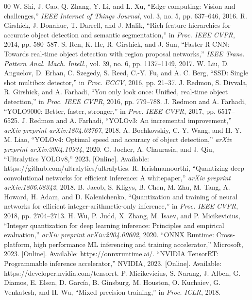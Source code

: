 \documentclass[conference]{IEEEtran}
\begin{document}
\begin{thebibliography}{00}
 W. Shi, J. Cao, Q. Zhang, Y. Li, and L. Xu, ``Edge computing: Vision and challenges,'' \textit{IEEE Internet of Things Journal}, vol. 3, no. 5, pp. 637--646, 2016.
 R. Girshick, J. Donahue, T. Darrell, and J. Malik, ``Rich feature hierarchies for accurate object detection and semantic segmentation,'' in \textit{Proc. IEEE CVPR}, 2014, pp. 580--587.
 S. Ren, K. He, R. Girshick, and J. Sun, ``Faster R-CNN: Towards real-time object detection with region proposal networks,'' \textit{IEEE Trans. Pattern Anal. Mach. Intell.}, vol. 39, no. 6, pp. 1137--1149, 2017.
 W. Liu, D. Anguelov, D. Erhan, C. Szegedy, S. Reed, C.-Y. Fu, and A. C. Berg, ``SSD: Single shot multibox detector,'' in \textit{Proc. ECCV}, 2016, pp. 21--37.
 J. Redmon, S. Divvala, R. Girshick, and A. Farhadi, ``You only look once: Unified, real-time object detection,'' in \textit{Proc. IEEE CVPR}, 2016, pp. 779--788.
 J. Redmon and A. Farhadi, ``YOLO9000: Better, faster, stronger,'' in \textit{Proc. IEEE CVPR}, 2017, pp. 6517--6525.
 J. Redmon and A. Farhadi, ``YOLOv3: An incremental improvement,'' \textit{arXiv preprint arXiv:1804.02767}, 2018.
 A. Bochkovskiy, C.-Y. Wang, and H.-Y. M. Liao, ``YOLOv4: Optimal speed and accuracy of object detection,'' \textit{arXiv preprint arXiv:2004.10934}, 2020.
 G. Jocher, A. Chaurasia, and J. Qiu, ``Ultralytics YOLOv8,'' 2023. [Online]. Available: https://github.com/ultralytics/ultralytics.
 R. Krishnamoorthi, ``Quantizing deep convolutional networks for efficient inference: A whitepaper,'' \textit{arXiv preprint arXiv:1806.08342}, 2018.
 B. Jacob, S. Kligys, B. Chen, M. Zhu, M. Tang, A. Howard, H. Adam, and D. Kalenichenko, ``Quantization and training of neural networks for efficient integer-arithmetic-only inference,'' in \textit{Proc. IEEE CVPR}, 2018, pp. 2704--2713.
 H. Wu, P. Judd, X. Zhang, M. Isaev, and P. Micikevicius, ``Integer quantization for deep learning inference: Principles and empirical evaluation,'' \textit{arXiv preprint arXiv:2004.09602}, 2020.
 ``ONNX Runtime: Cross-platform, high performance ML inferencing and training accelerator,'' Microsoft, 2023. [Online]. Available: https://onnxruntime.ai/.
 ``NVIDIA TensorRT: Programmable inference accelerator,'' NVIDIA, 2023. [Online]. Available: https://developer.nvidia.com/tensorrt.
 P. Micikevicius, S. Narang, J. Alben, G. Diamos, E. Elsen, D. Garc\'{i}a, B. Ginsburg, M. Houston, O. Kuchaiev, G. Venkatesh, and H. Wu, ``Mixed precision training,'' in \textit{Proc. ICLR}, 2018.

\end{thebibliography}
\end{document}
